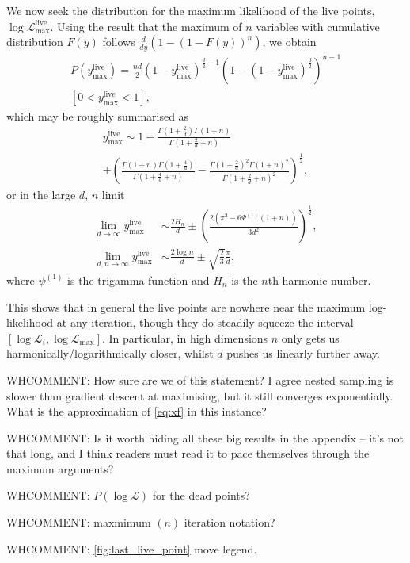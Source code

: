 \documentclass[usenatbib]{mnras}
\begin{document}
We now seek the distribution for the maximum likelihood of the live points, $\log\mathcal{L}_\mathrm{max}^{\mathrm{live}}$. Using the result that the maximum of $n$ variables with cumulative distribution $F(y)$ follows $\frac{d}{dy}( 1- (1-F(y))^n)$, we obtain
\begin{multline}
    P(y_\mathrm{max}^\mathrm{live}) = \frac{nd}{2}(1-y_\mathrm{max}^\mathrm{live})^{\frac{d}{2}-1}\left(1-(1-y_\mathrm{max}^\mathrm{live})^{\frac{d}{2}}\right)^{n-1}\\ 
    [0<y_\mathrm{max}^\mathrm{live}<1],
    \label{eq:Pyhat}
\end{multline}
which may be roughly summarised as
\begin{multline}
    y_\mathrm{max}^\mathrm{live} \sim 1-\frac{\Gamma(1+\frac{2}{d})\Gamma(1+n)}{\Gamma(1+\frac{2}{d}+n)} \\
     \pm \left( \frac{\Gamma(1+n)\Gamma(1+\frac{4}{d})}{\Gamma(1+\frac{4}{d}+n)} - \frac{\Gamma(1+\frac{2}{d})^2 \Gamma(1+n)^2}{\Gamma(1+\frac{2}{d}+n)^2}\right)^{\frac{1}{2}},
    \label{eq:ymax}
\end{multline}
or in the large $d$, $n$ limit
\begin{align}
    \lim_{d\to\infty} y_\mathrm{max}^\mathrm{live} &\sim \frac{2H_n}{d} \pm \left(\frac{2(\pi^2 - 6\Psi^{(1)}(1+n))}{3d^2}\right)^{\frac{1}{2}},
    \label{eq:ymaxd}\\
    \lim_{d,n\to\infty} y_\mathrm{max}^\mathrm{live} &\sim \frac{2\log n}{d} \pm \sqrt{\frac{2}{3}}\frac{\pi}{d},
    \label{eq:ymaxdn}
\end{align}
where $\psi^{(1)}$ is the trigamma function and $H_n$ is the $n$th harmonic number.
\par
This shows that in general the live points are nowhere near the maximum log-likelihood at any iteration, though they do steadily squeeze the interval $[\log\mathcal{L}_i,\log\mathcal{L}_\mathrm{max}]$. In particular, in high dimensions $n$ only gets us harmonically/logarithmically closer, whilst $d$ pushes us linearly further away.

WHCOMMENT: How sure are we of this statement? I agree nested sampling is slower than gradient descent at maximising, but it still converges exponentially. What is the approximation of \cref{eq:xf} in this instance?

WHCOMMENT: Is it worth hiding all these big results in the appendix -- it's not that long, and I think readers must read it to pace themselves through the maximum arguments?

WHCOMMENT: $P(\log\mathcal{L})$ for the dead points?

WHCOMMENT: maxmimum $(n)$ iteration notation?

WHCOMMENT: \cref{fig:last_live_point} move legend.




\label{lastpage}
\end{document}
